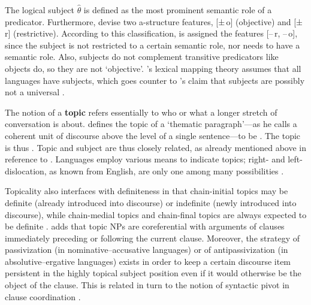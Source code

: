 The logical subject $\hat{\theta}$ is defined as 
{the most prominent semantic role of a predicator}. Furthermore,
\citet{bresnan2016} devise two a-structure features, [±\,o] (objective) and
[±\,r] (restrictive). According to this classification, \Subj{} is assigned the
features [–\,r, –\,o], since the subject is not restricted to a certain
semantic role, nor needs to have a semantic role. Also, subjects do not
complement transitive predicators like objects do, so they are not `objective'.
\citet{bresnan2016}'s lexical mapping theory assumes that all languages have
subjects, which goes counter to \textcites{schachter1976}{schachter2015}'s
claim that subjects are possibly not a universal \citep[330--331]{bresnan2016}.

The notion of a \textbf{topic} refers essentially to who or what a longer
stretch of conversation is about. \citet{givon1983} defines the topic of a
`thematic paragraph'---as he calls a coherent unit of discourse above the level
of a single sentence---to be . The topic is thus . Topic and subject are thus closely related, as already
mentioned above in reference to \citet{comrie1989}. Languages employ various means to indicate topics; right- and left-dislocation, as known from English, are only one among many possibilities \citep[174]{dixon2010}.

Topicality also interfaces with definiteness in that chain-initial topics may
be definite (already introduced into discourse) or indefinite (newly introduced
into discourse), while chain-medial topics and chain-final topics are always
expected to be definite \citep[10]{givon1983}. \citet[171]{dixon2010} adds that
topic NPs are coreferential with arguments of clauses immediately preceding or
following the current clause. Moreover, the strategy of passivization (in
nominative--accusative languages) or of antipassivization (in
absolutive--ergative languages) exists in order to keep a certain discourse
item persistent in the highly topical subject position even if it would
otherwise be the object of the clause. This is related in turn to the notion of
syntactic pivot in clause coordination \citep[172]{dixon2010}.

